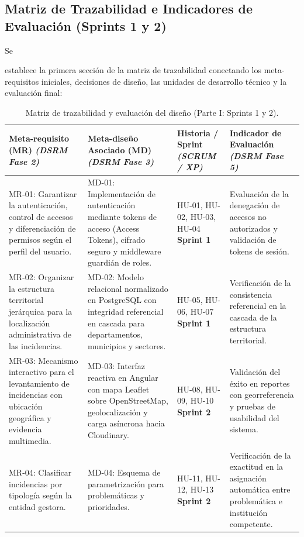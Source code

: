 \subsection{Matriz de Trazabilidad e Indicadores de Evaluación (Sprints 1 y 2)}
\label{subsec:matriz_trazabilidad}
\hypertarget{subsec:matriz}{Se} establece la primera sección de la matriz de trazabilidad conectando los meta-requisitos iniciales, decisiones de diseño, las unidades de desarrollo técnico y la evaluación final:

\begin{table}[htbp]
	\centering
	\caption{Matriz de trazabilidad y evaluación del diseño (Parte I: Sprints 1 y 2).}
	\label{tab:trazabilidad_parte1}
	\begin{tabularx}{\textwidth}{|X|X|X|X|}
		\hline
		\textbf{Meta-requisito (MR)} \newline \textit{(DSRM Fase 2)} & 
		\textbf{Meta-diseño Asociado (MD)} \newline \textit{(DSRM Fase 3)} & 
		\textbf{Historia / Sprint} \newline \textit{(SCRUM / XP)} & 
		\textbf{Indicador de Evaluación} \newline \textit{(DSRM Fase 5)} \\ \hline
		MR-01: Garantizar la autenticación, control de accesos y diferenciación de permisos según el perfil del usuario. & 
		MD-01: Implementación de autenticación mediante tokens de acceso (Access Tokens), cifrado seguro y middleware guardián de roles. & 
		HU-01, HU-02, HU-03, HU-04 \newline \textbf{Sprint 1} & 
		Evaluación de la denegación de accesos no autorizados y validación de tokens de sesión. \\ \hline
		MR-02: Organizar la estructura territorial jerárquica para la localización administrativa de las incidencias. & 
		MD-02: Modelo relacional normalizado en PostgreSQL con integridad referencial en cascada para departamentos, municipios y sectores. & 
		HU-05, HU-06, HU-07 \newline \textbf{Sprint 1} & 
		Verificación de la consistencia referencial en la cascada de la estructura territorial. \\ \hline
		MR-03: Mecanismo interactivo para el levantamiento de incidencias con ubicación geográfica y evidencia multimedia. & 
		MD-03: Interfaz reactiva en Angular con mapa Leaflet sobre OpenStreetMap, geolocalización y carga asíncrona hacia Cloudinary. & 
		HU-08, HU-09, HU-10 \newline \textbf{Sprint 2} & 
		Validación del éxito en reportes con georreferencia y pruebas de usabilidad del sistema. \\ \hline
		MR-04: Clasificar incidencias por tipología según la entidad gestora. & 
		MD-04: Esquema de parametrización para problemáticas y prioridades. & 
		HU-11, HU-12, HU-13 \newline \textbf{Sprint 2} & 
		Verificación de la exactitud en la asignación automática entre problemática e institución competente. \\ \hline
	\end{tabularx}
\end{table}

